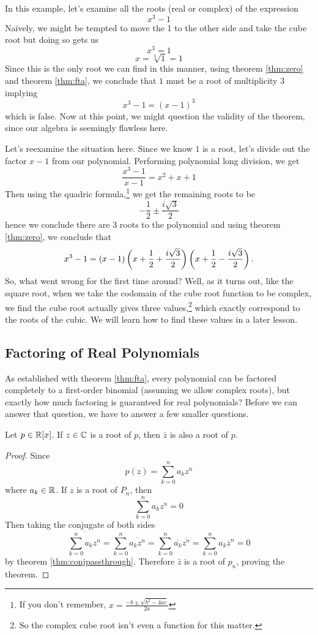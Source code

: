 \begin{ex}
	In this example, let's examine all the roots (real or complex) of the expression
	$$x^3-1$$
	Na\"ively, we might be tempted to move the 1 to the other side and take the cube root but doing so gets us
	$$x^3=1$$
	$$x=\sqrt[3]{1}=1$$
	Since this is the only root we can find in this manner, using theorem \eqref{thm:zero} and theorem \eqref{thm:fta},
we conclude that $1$ must be a root of multiplicity 3 implying 
$$x^3-1=(x-1)^3$$
which is false. Now at this point, we might question the validity of the theorem, since our algebra is seemingly flawless here.

Let's reexamine the situation here. Since we know $1$ is a root, let's divide out the factor $x-1$ from our polynomial. Performing polynomial long division, we get
$$\frac{x^3-1}{x-1}=x^2+x+1$$
Then using the quadric formula,\footnote{
If you don't remember, $x=\frac{-b\pm\sqrt{b^2-4ac}}{2a}$}
we get the remaining roots to be
$$-\frac{1}{2}\pm \frac{i\sqrt{3}}{2}$$
hence we conclude there are 3 roots to the polynomial and using theorem \eqref{thm:zero}, we conclude that
$$x^3-1=(x-1)\left(x+\frac{1}{2}+\frac{i\sqrt{3}}{2}\right)\left(x+\frac{1}{2}-\frac{i\sqrt{3}}{2}\right).$$
So, what went wrong for the first time around? Well, as it turns out, like the square root, when we take the codomain of the cube root function to be complex, we find the cube root actually gives three values,\footnote{So the complex cube root isn't even a function for this matter.} which exactly correspond to the roots of the cubic. We will learn how to find these values in a later lesson. 
\end{ex}

\subsection{Factoring of Real Polynomials}
As established with theorem \eqref{thm:fta}, every polynomial can be factored completely to a first-order binomial (assuming we allow complex roots), but exactly how much factoring is guaranteed for real polynomials? Before we can answer that question, we have to answer a few smaller questions.

\begin{theorem}
\label{thm:conjpair}
Let $p\in \mathbb{R}[x]$. If $z\in\mathbb{C}$ is a root of $p$, then $\bar{z}$ is also a root of $p$.	
\end{theorem}
\begin{proof}
	Since
	$$p(z)=\sum^n_{k=0}a_kz^n$$
	where $a_k\in\mathbb{R}$. If $z$ is a root of $P_n$, then
	$$\sum^n_{k=0}a_kz^n=0$$
	Then taking the conjugate of both sides
	$$\overline{\sum^n_{k=0}a_kz^n}=
	\sum^n_{k=0}\overline{a_kz^n}=
	\sum^n_{k=0}\overline{a_k}\overline{z^n}=
	\sum^n_{k=0}a_k\overline{z}^n=0$$
	by theorem \eqref{thm:conjpassthrough}. Therefore $\bar{z}$ is a root of $p_n$, proving the theorem.
\end{proof}


